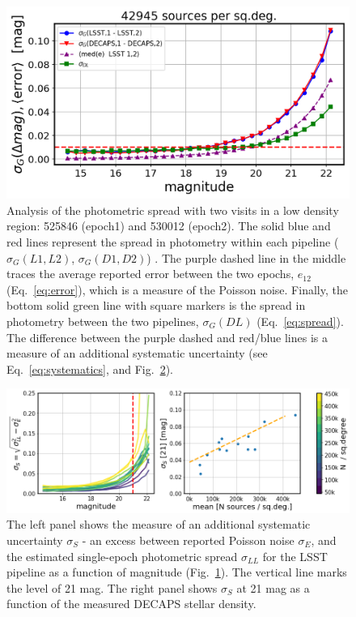\documentclass[DM,lsstdraft,toc,usenatbib]{lsstdoc}
\begin{document}
\begin{figure}
\begin{centering}
\includegraphics[width=0.8\columnwidth]{figs/photometric_spread_2_525846-530012.png}
\caption{Analysis of the photometric spread with two visits in a low density region:  525846 (epoch1) and 530012 (epoch2). The solid blue and red lines represent the spread in photometry within each pipeline ($\sigma_{G}(L1,L2)$, $\sigma_{G}(D1,D2)$) . The purple dashed line in the middle traces the average reported error between the two epochs, $e_{12}$ (Eq.~\ref{eq:error}), which is a measure of the Poisson noise. Finally, the bottom solid green line with square markers is the spread in photometry between the two pipelines, $\sigma_{G}(DL)$ (Eq.~\ref{eq:spread}). The difference between the purple dashed and red/blue lines is a measure of an additional systematic uncertainty (see Eq.~\ref{eq:systematics}, and Fig.~\ref{fig:spread_summary}).}
\label{fig:spread}
\end{centering}
\end{figure} 



\begin{figure}
\begin{centering}
\includegraphics[width=0.95\columnwidth]{figs/photometric_offset_combined.png}
\caption{The left panel shows the measure of an additional  systematic uncertainty $\sigma_{S}$ - an excess between reported Poisson noise $\sigma_{E}$, and the estimated single-epoch photometric spread $\sigma_{LL}$ for the LSST pipeline as a function of magnitude (Fig.~\ref{fig:spread}). The vertical line marks the level of 21 mag. The right panel shows $\sigma_{S}$ at 21 mag  as a function of the  measured DECAPS stellar density.}
\label{fig:spread_summary}
\end{centering}
\end{figure} 
\end{document}
